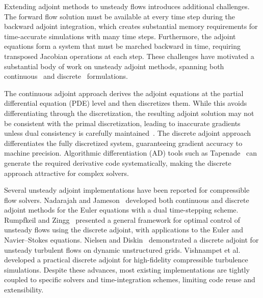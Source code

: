 \documentclass[journal]{new-aiaa}
\begin{document}
Extending adjoint methods to unsteady flows introduces additional challenges.
The forward flow solution must be available at every time step during the backward adjoint integration, which creates substantial memory requirements for time-accurate simulations with many time steps.
Furthermore, the adjoint equations form a system that must be marched backward in time, requiring transposed Jacobian operations at each step.
These challenges have motivated a substantial body of work on unsteady adjoint methods, spanning both continuous~\cite{Nadarajah2003, Rumpfkeil2010} and discrete~\cite{Nielsen2004, Vishnampet2015} formulations.

The continuous adjoint approach derives the adjoint equations at the partial differential equation (PDE) level and then discretizes them.
While this avoids differentiating through the discretization, the resulting adjoint solution may not be consistent with the primal discretization, leading to inaccurate gradients unless dual consistency is carefully maintained~\cite{Hicken2014}.
The discrete adjoint approach differentiates the fully discretized system, guaranteeing gradient accuracy to machine precision.
Algorithmic differentiation (AD) tools such as Tapenade~\cite{Hascoet2013} can generate the required derivative code systematically, making the discrete approach attractive for complex solvers.

Several unsteady adjoint implementations have been reported for compressible flow solvers.
Nadarajah and Jameson~\cite{Nadarajah2003} developed both continuous and discrete adjoint methods for the Euler equations with a dual time-stepping scheme.
Rumpfkeil and Zingg~\cite{Rumpfkeil2010} presented a general framework for optimal control of unsteady flows using the discrete adjoint, with applications to the Euler and Navier--Stokes equations.
Nielsen and Diskin~\cite{Nielsen2004} demonstrated a discrete adjoint for unsteady turbulent flows on dynamic unstructured grids.
Vishnampet et al.~\cite{Vishnampet2015} developed a practical discrete adjoint for high-fidelity compressible turbulence simulations.
Despite these advances, most existing implementations are tightly coupled to specific solvers and time-integration schemes, limiting code reuse and extensibility.
\end{document}
